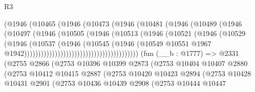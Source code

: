 \begin{lexlean}{R3}
\begin{coremodule}
                                      (@1946
                                        (@10465
                                          (@1946
                                            (@10473
                                              (@1946
                                                (@10481
                                                  (@1946
                                                    (@10489
                                                      (@1946
                                                        (@10497
                                                          (@1946
                                                            (@10505
                                                              (@1946
                                                                (@10513
                                                                  (@1946
                                                                    (@10521
                                                                      (@1946
                                                                        (@10529
                                                                          (@1946
                                                                            (@10537
                                                                              (@1946
                                                                                (@10545
                                                                                  (@1946
                                                                                    (@10549
                                                                                      @10551
                                                                                      @1967
                                                                                      @1942)))))))))))))))))))))))))))))))))))))))))
    (fun (__b : @1777) =>
    @2331
      (@2755
        @2866
        (@2753
          @10396
          @10399
          @2873
          (@2753
            @10404
            @10407
            @2880
            (@2753
              @10412
              @10415
              @2887
              (@2753
                @10420
                @10423
                @2894
                (@2753
                  @10428
                  @10431
                  @2901
                  (@2753
                    @10436
                    @10439
                    @2908
                    (@2753
                      @10444
                      @10447

\end{coremodule}
\end{lexlean}
